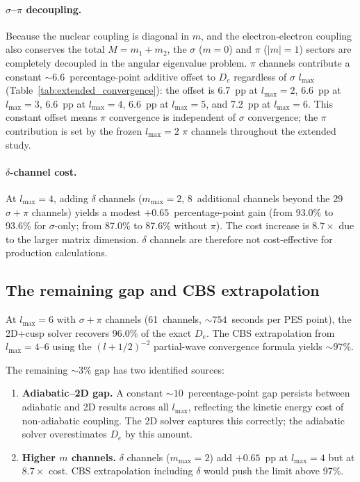 \documentclass[aps,pra,twocolumn,superscriptaddress,longbibliography]{revtex4-2}
\begin{document}
\paragraph{$\sigma$--$\pi$ decoupling.}
Because the nuclear coupling is diagonal in $m$, and the electron-electron
coupling also conserves the total $M = m_1 + m_2$, the $\sigma$ ($m = 0$)
and $\pi$ ($|m| = 1$) sectors are completely decoupled in the angular
eigenvalue problem.  $\pi$ channels contribute a constant
${\sim}6.6$~percentage-point additive offset to $D_e$ regardless of
$\sigma$ $l_{\max}$ (Table~\ref{tab:extended_convergence}):
the offset is 6.7~pp at $l_{\max} = 2$, 6.6~pp at $l_{\max} = 3$,
6.6~pp at $l_{\max} = 4$, 6.6~pp at $l_{\max} = 5$, and
7.2~pp at $l_{\max} = 6$.
This constant offset means $\pi$ convergence is independent of $\sigma$
convergence; the $\pi$ contribution is set by the frozen $l_{\max} = 2$
$\pi$ channels throughout the extended study.

\paragraph{$\delta$-channel cost.}
At $l_{\max} = 4$, adding $\delta$ channels ($m_{\max} = 2$,
8~additional channels beyond the 29 $\sigma{+}\pi$ channels)
yields a modest $+0.65$~percentage-point gain (from 93.0\% to
93.6\% for $\sigma$-only; from 87.0\% to 87.6\% without $\pi$).
The cost increase is $8.7\times$ due to the larger matrix dimension.
$\delta$ channels are therefore not cost-effective for production
calculations.

\subsection{The remaining gap and CBS extrapolation}

At $l_{\max} = 6$ with $\sigma{+}\pi$ channels (61~channels,
${\sim}754$~seconds per PES point), the 2D+cusp solver recovers
96.0\% of the exact $D_e$.  The CBS extrapolation from $l_{\max} =
4$--$6$ using the $(l + 1/2)^{-2}$ partial-wave convergence formula
yields ${\sim}97\%$.

The remaining ${\sim}3\%$ gap has two identified sources:
\begin{enumerate}
  \item \textbf{Adiabatic--2D gap.}  A constant ${\sim}10$~percentage-point
    gap persists between adiabatic and 2D results across all $l_{\max}$,
    reflecting the kinetic energy cost of non-adiabatic coupling.  The
    2D solver captures this correctly; the adiabatic solver overestimates
    $D_e$ by this amount.
  \item \textbf{Higher $m$ channels.}  $\delta$ channels ($m_{\max} = 2$)
    add $+0.65$~pp at $l_{\max} = 4$ but at $8.7\times$ cost.
    CBS extrapolation including $\delta$ would push the limit above 97\%.
\end{enumerate}
\end{document}
